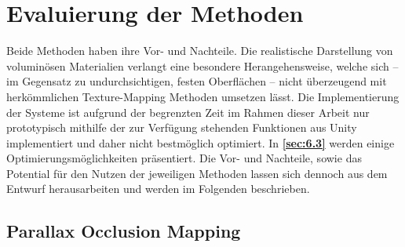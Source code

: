 \section{Evaluierung der Methoden}
\label{sec:5}

Beide Methoden haben ihre Vor- und Nachteile. Die realistische Darstellung von voluminösen Materialien verlangt 
eine besondere Herangehensweise, welche sich – im Gegensatz zu undurchsichtigen, festen Oberflächen – 
nicht überzeugend mit herkömmlichen Texture-Mapping Methoden umsetzen lässt. 
Die Implementierung der Systeme ist aufgrund der begrenzten Zeit im Rahmen dieser Arbeit nur prototypisch mithilfe der 
zur Verfügung stehenden Funktionen aus Unity implementiert und daher nicht bestmöglich optimiert. 
In \textbf{\autoref{sec:6.3}} werden einige Optimierungsmöglichkeiten präsentiert. 
Die Vor- und Nachteile, sowie das Potential für den Nutzen der jeweiligen Methoden lassen sich dennoch aus dem Entwurf 
herausarbeiten und werden im Folgenden beschrieben.


\subsection{Parallax Occlusion Mapping}
\label{sec:5.1}


